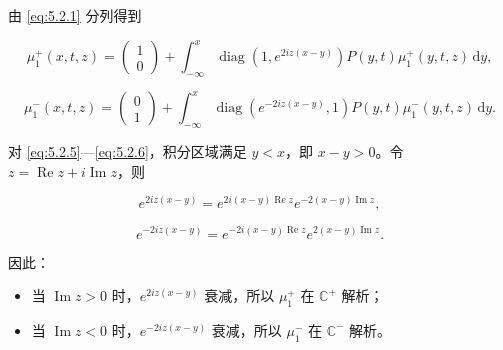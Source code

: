 \documentclass[
    lang=cn,
    scheme=chinese,
    mode=simple,
    device=normal,
    color=blue,
    math=cm,
    thmcnt=section,
    12pt,
    nowatermark
]{elegantbook}
\begin{document}
由 \eqref{eq:5.2.1} 分列得到

\begin{equation}
    \mu_1^+(x,t,z)
    =
    \begin{pmatrix}1\\0\end{pmatrix}
    +
    \int_{-\infty}^{x}
    \operatorname{diag}\!\left(1,e^{2iz(x-y)}\right)
    P(y,t)\mu_1^+(y,t,z)\,\mathrm dy,
    \tag{5.2.5}
    \label{eq:5.2.5}
\end{equation}

\begin{equation}
    \mu_1^-(x,t,z)
    =
    \begin{pmatrix}0\\1\end{pmatrix}
    +
    \int_{-\infty}^{x}
    \operatorname{diag}\!\left(e^{-2iz(x-y)},1\right)
    P(y,t)\mu_1^-(y,t,z)\,\mathrm dy.
    \tag{5.2.6}
    \label{eq:5.2.6}
\end{equation}

对 \eqref{eq:5.2.5}---\eqref{eq:5.2.6}，积分区域满足 $y<x$，即 $x-y>0$。令 $z=\operatorname{Re}z+i\operatorname{Im}z$，则

\[
    e^{2iz(x-y)}
    =
    e^{2i(x-y)\operatorname{Re}z}
    e^{-2(x-y)\operatorname{Im}z},
\]

\[
    e^{-2iz(x-y)}
    =
    e^{-2i(x-y)\operatorname{Re}z}
    e^{2(x-y)\operatorname{Im}z}.
\]

因此：

\begin{itemize}
    \item 当 $\operatorname{Im}z>0$ 时，$e^{2iz(x-y)}$ 衰减，所以 $\mu_1^+$ 在 $\mathbb{C}^+$ 解析；
    \item 当 $\operatorname{Im}z<0$ 时，$e^{-2iz(x-y)}$ 衰减，所以 $\mu_1^-$ 在 $\mathbb{C}^-$ 解析。
\end{itemize}
\end{document}
